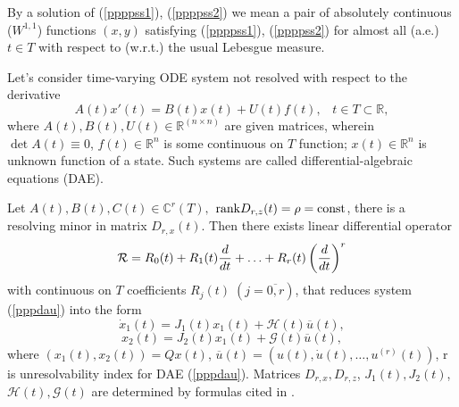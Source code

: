 \documentclass[12pt]{llncs}
\begin{document}
By a solution of (\ref{ppppss1}), (\ref{ppppss2}) we mean a pair of absolutely continuous ($W^{1,1}$) functions $(x, y)$ satisfying (\ref{ppppss1}), (\ref{ppppss2}) for almost all (a.e.) $t \in T$ with respect to (w.r.t.) the usual Lebesgue measure.


Let's consider time-varying ODE system not resolved with respect to the derivative
\begin{equation}\label{pppdau}
A(t)x'(t)=B(t)x(t) + U(t)f(t), \;\;\; t \in T \subset {\mathbb R},
\end{equation}
where $A(t), B(t), U(t) \in \mathbb R^{(n\times n)}$ are given matrices, wherein $\det A(t) \equiv 0$, $f(t) \in {\mathbb R}^n$ is some continuous on $T$ function; $x(t) \in {\mathbb R}^n$ is unknown function of a state. Such systems are called differential-algebraic equations (DAE). 

\begin{lemma}{\rm \cite{pppSCH2008}}
Let $A(t), B(t), C(t) \in \mathbb C^r(T),$ ${\rm rank} D_{r,z}(t) = \rho = {\rm const}$, there is a resolving minor in matrix $D_{r,x}(t)$. Then there exists linear differential operator
$$
{\mathcal R}=R_0(t) +R_1(t){{d}\over{dt}}+\ldots +R_r(t)\left( {{d}\over{dt}}\right) ^r
$$
with continuous on $T$ coefficients
$R_j(t)\; (j=\overline{0,r})$, that reduces system (\ref{pppdau}) into the form
$$
\dot{x}_1(t) = J_1(t)x_1(t)+{\mathcal H}(t) \overline{u}(t),
$$
$$
x_2(t) = J_2(t)x_1(t)+{\mathcal G}(t) \overline{u}(t),
$$
where $\left( x_1(t), x_2(t) \right)=Qx(t)$, $\overline{u}(t) = (u(t), \dot{u}(t),\ldots, u^{(r)}(t))$, r is unresolvability index for DAE (\ref{pppdau}). Matrices $D_{r,x}, D_{r,z}$, $J_1(t), J_2(t)$, ${\mathcal H}(t), {\mathcal G}(t)$ are determined by formulas cited in \cite{pppSCH2008}.
\end{lemma}
\end{document}
